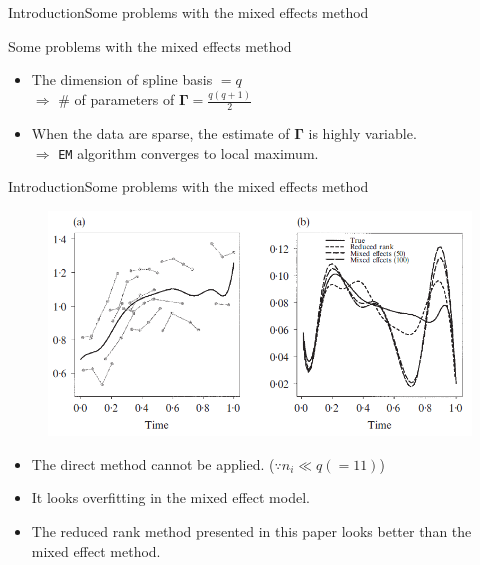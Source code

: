 \documentclass{beamer}
\def \bGamma {\boldsymbol{\Gamma}}
\begin{document}
\begin{frame}{Introduction}{Some problems with the mixed effects method}
	\begin{block}{Some problems with the mixed effects method}
		\begin{itemize}
			\item {
				The dimension of spline basis $=q$ \\
				$\Rightarrow$ \# of parameters of $\bGamma= \frac{q(q+1)}{2}$ 
			}
			\item {
				When the data are sparse, the estimate of $\bGamma$ is highly variable.\\
				$\Rightarrow$ \texttt{EM} algorithm converges to local maximum.
			}
		\end{itemize}
	\end{block}
\end{frame}

\begin{frame}{Introduction}{Some problems with the mixed effects method}
	\begin{figure}[h] %
		\begin{center}
			\includegraphics[width=0.7\linewidth]{img/2.png}
		\end{center}
		\label{fig:long}
		\label{fig:onecol}
	\end{figure}	
	\begin{itemize}
		\item {
			The direct method cannot be applied. ($\because n_i \ll q(=11)$)
		}
		\item {
			It looks overfitting in the mixed effect model.
		}
		\item {
			The reduced rank method presented in this paper looks better than the mixed effect method.
		}
	\end{itemize}
\end{frame}
\end{document}
